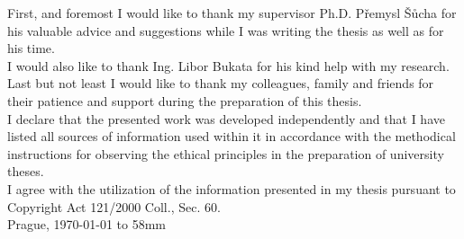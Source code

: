 \documentclass[11pt,twoside,a4paper,dvipsnames,svgnames]{book}
\author{Jan Dryk}
\begin{document}

\cleardoublepage

\maketitle
\cleardoublepage

{%
	First, and foremost I would like to thank my supervisor Ph.D. Přemysl Šůcha for his
    valuable advice and suggestions while I was writing the thesis as well as for his time.\\
    
    I would also like to thank Ing. Libor Bukata for his kind help with my research.\\
    
    Last but not least I would like to thank my colleagues, family and friends for their patience
    and support during the preparation of this thesis. \\
}
{%
    I declare that the presented work was developed independently and that I have listed
    all sources of information used within it in accordance with the methodical instructions for
    observing the ethical principles in the preparation of university theses. \\
    
    I agree with the utilization of the information presented in my thesis pursuant to
    Copyright Act 121/2000 Coll., Sec. 60. 
\\[90mm]
	Prague, \today \vspace{10mm} \hfill \hbox to 58mm{\tiny\dotfill}
}

\cleardoublepage


{
    
}
{
    
}

\setcounter{page}{1}

\tableofcontents











\printbibliography
\appendix



% 

\end{document}
